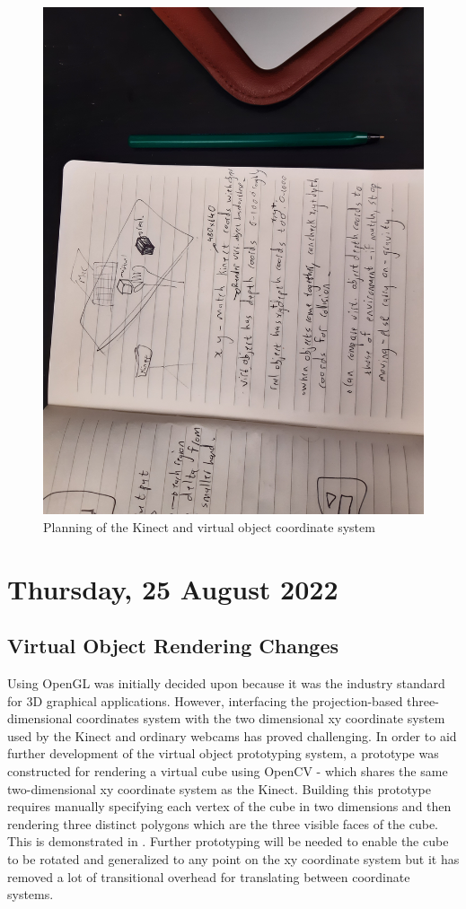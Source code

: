\begin{figure}[h]
    \centering
    \includegraphics[width=0.7\linewidth]{figures/kinect_world_coords_planning.jpg}
    \caption{Planning of the Kinect and virtual object coordinate system}
    \label{fig:kinect_world_coords_planning}
\end{figure}

\section[2022/08/25]{Thursday, 25 August 2022}

\subsection{Virtual Object Rendering Changes}

Using OpenGL was initially decided upon because it was the industry standard for 3D graphical applications. However, interfacing the projection-based three-dimensional coordinates system with the two dimensional xy coordinate system used by the Kinect and ordinary webcams has proved challenging. In order to aid further development of the virtual object prototyping system, a prototype was constructed for rendering a virtual cube using OpenCV - which shares the same two-dimensional xy coordinate system as the Kinect. Building this prototype requires manually specifying each vertex of the cube in two dimensions and then rendering three distinct polygons which are the three visible faces of the cube. This is demonstrated in . Further prototyping will be needed to enable the cube to be rotated and generalized to any point on the xy coordinate system but it has removed a lot of transitional overhead for translating between coordinate systems.

